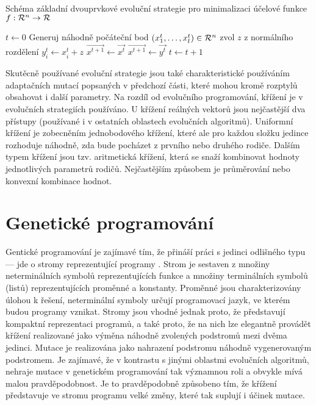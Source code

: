 \documentclass[12pt,fleqn,a4paper,proc]{article}
\newcommand{\Real}{{\cal R}}
\begin{document}
\begin{algorithm}
\caption{Schéma základní dvouprvkové evoluční strategie pro minimalizaci účelové funkce $f:\Real^n\to\Real$}
\label{obrsches}
\begin{algorithmic}
\State $t \gets 0$
\State Generuj náhodně počáteční bod $(x_1^t, \dots , x_l^t)\in\Real^n$
\State 	zvol $z$ z normálního rozdělení
\State 	$y_i^t \gets x_i^t + z$
\EndFor
{}
\State $\vec{x^{t+1}} \gets \vec{x^t}$
\Else
\State $\vec{x^{t+1}} \gets \vec{y^t}$
\EndIf
\State $t \gets t+1$
\EndWhile
\EndProcedure
\end{algorithmic}
\end{algorithm}

Skutěcně používané evoluční strategie jsou také charakteristické používáním adaptačních mutací popsaných v předchozí části, které mohou kromě rozptylů obsahovat i další parametry. Na rozdíl od evolučního programování, křížení je v evolučních strategiích používáno. U křížení reálných vektorů jsou nejčastější dva přístupy (používané i v ostatních oblastech evolučních algoritmů). Uniformní křížení je zobecněním jednobodového křížení, které ale pro každou složku jedince rozhoduje náhodně, zda bude pocházet z prvního nebo druhého rodiče. Dalším typem křížení jsou tzv. aritmetická křížení, která se snaží kombinovat hodnoty jednotlivých parametrů rodičů. Nejčastějším způsobem je průměrování nebo konvexní kombinace hodnot. 

\section{Genetické programování}

Gentické programování je zajímavé tím, že přináší práci s jedinci odlišného typu --- jde o stromy reprezentující programy \cite{koza}. Strom je sestaven z množiny neterminálních symbolů reprezentujících funkce a množiny terminálních symbolů (listů) reprezentujících proměnné a konstanty. Proměnné jsou charakterizovány úlohou k řešení, neterminální symboly určují programovací jazyk, ve kterém budou programy vznikat. Stromy jsou vhodné jednak proto, že představují kompaktní reprezentaci programů, a také proto, že na nich lze elegantně provádět křížení realizované jako výměna náhodně zvolených podstromů mezi dvěma jedinci. Mutace je realizována jako nahrazení podstromu náhodně vygenerovaným podstromem. Je zajímavé, že v kontrastu s jinými oblastmi evolučních algoritmů, nehraje mutace v genetickém programování tak významnou roli a obvykle mívá malou pravděpodobnost. Je to pravděpodobně způsobeno tím, že křížení představuje ve stromu programu velké změny, které tak suplují i účinek mutace.
\end{document}
